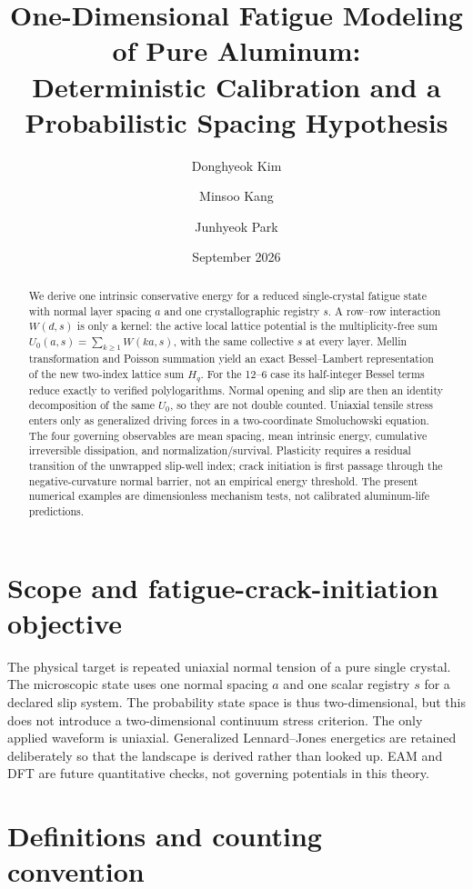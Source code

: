 \documentclass[11pt,letterpaper]{article}
\title{One-Dimensional Fatigue Modeling of Pure Aluminum:\\
Deterministic Calibration and a Probabilistic Spacing Hypothesis}
\author{Donghyeok Kim \and Minsoo Kang \and Junhyeok Park}
\date{September 2026}
\begin{document}
\maketitle

\begin{abstract}
We derive one intrinsic conservative energy for a reduced single-crystal
fatigue state with normal layer spacing $a$ and one crystallographic registry
$s$.  A row--row interaction $W(d,s)$ is only a kernel: the active local
lattice potential is the multiplicity-free sum $U_0(a,s)=\sum_{k\ge1}W(ka,s)$,
with the same collective $s$ at every layer.  Mellin transformation and
Poisson summation yield an exact Bessel--Lambert representation of the new
two-index lattice sum $H_q$.  For the 12--6 case its half-integer Bessel terms
reduce exactly to verified polylogarithms.  Normal opening and slip are then
an identity decomposition of the same $U_0$, so they are not double counted.
Uniaxial tensile stress enters only as generalized driving forces in a
two-coordinate Smoluchowski equation.  The four governing observables are
mean spacing, mean intrinsic energy, cumulative irreversible dissipation, and
normalization/survival.  Plasticity requires a residual transition of the
unwrapped slip-well index; crack initiation is first passage through the
negative-curvature normal barrier, not an empirical energy threshold.  The
present numerical examples are dimensionless mechanism tests, not calibrated
aluminum-life predictions.
\end{abstract}

\section{Scope and fatigue-crack-initiation objective}
\label{sec:scope}

The physical target is repeated uniaxial normal tension of a pure single
crystal.  The microscopic state uses one normal spacing $a$ and one scalar
registry $s$ for a declared slip system.  The probability state space is thus
two-dimensional, but this does not introduce a two-dimensional continuum
stress criterion.  The only applied waveform is uniaxial.  Generalized
Lennard--Jones energetics are retained deliberately so that the landscape is
derived rather than looked up.  EAM and DFT are future quantitative checks,
not governing potentials in this theory.

\section{Definitions and counting convention}
\label{sec:counting}
\end{document}
